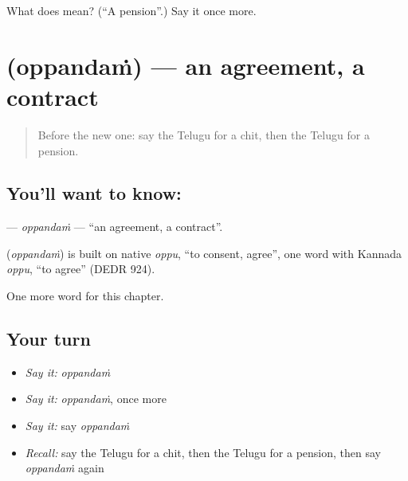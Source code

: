 \begin{tcolorbox}[breakable,colback=teal!4,colframe=teal!35!black,title={Before you move on}]
What does  mean? (\textquotedblleft{}A pension\textquotedblright{}.) Say it once more.
\end{tcolorbox}
\section[\texorpdfstring{\te{ఒప్పందం} (oppandaṁ)}{ఒప్పందం (oppandaṁ)}]{ (oppandaṁ) — an agreement, a contract}

\label{lesson:TE-C239-oppandam}



\begin{quote}
Before the new one: say the Telugu for a chit, then the Telugu for a pension.
\end{quote}

\subsection*{You'll want to know: }
\textbf{} — \emph{oppandaṁ} — \textquotedblleft{}an agreement, a contract\textquotedblright{}.

\begin{cousinweb}
\textbf{} (\emph{oppandaṁ}) is built on native \emph{oppu}, \textquotedblleft{}to consent, agree\textquotedblright{}, one word with Kannada \emph{oppu}, \textquotedblleft{}to agree\textquotedblright{} (DEDR 924).
\end{cousinweb}

\begin{grammarlens}[title={What you've built}]
One more word for this chapter.
\end{grammarlens}

\subsection*{Your turn}
\begin{itemize}
\raggedright
  \item \emph{Say it:} \emph{oppandaṁ}
  \item \emph{Say it:} \emph{oppandaṁ}, once more
  \item \emph{Say it:} say \emph{oppandaṁ}
  \item \emph{Recall:} say the Telugu for a chit, then the Telugu for a pension, then say \emph{oppandaṁ} again
\end{itemize}

